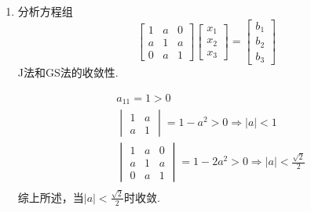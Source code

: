\documentclass[a4paper]{article}
\begin{document}
\begin{enumerate}
  \item 分析方程组$$\begin{bmatrix}
  1 & a & 0 \\
  a & 1 & a \\
  0 & a & 1
  \end{bmatrix}
  \begin{bmatrix}
  x_1 \\
  x_2 \\
  x_3
  \end{bmatrix}
  =
  \begin{bmatrix}
  b_1 \\
  b_2 \\
  b_3
  \end{bmatrix}$$J法和GS法的收敛性.
  \begin{solution}
    \begin{align*}
      &a_{11}=1>0\\
      &\begin{vmatrix}1 & a \\ a & 1\end{vmatrix}=1-a^2>0\Rightarrow |a|<1\\
      &\begin{vmatrix}1 & a & 0 \\ a & 1 & a \\ 0 & a & 1\end{vmatrix}=1-2a^2>0\Rightarrow |a|<\frac{\sqrt{2}}{2}\\
    \end{align*}
    综上所述，当$|a|<\frac{\sqrt{2}}{2}$时收敛.\\
  \end{solution}


\end{enumerate}
\end{document}
